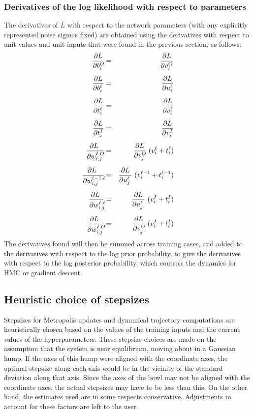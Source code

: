 \documentclass{report}[11pt]
\def\beq{\begin{eqnarray}}
\def\eeq{\end{eqnarray}}
\begin{document}
\subsubsection*{Derivatives of the log likelihood with respect to parameters}

The derivatives of $L$ with respect to the network parameters (with
any explicitly represented noise sigmas fixed) are obtained using the
derivatives with respect to unit values and unit inputs that were found in 
the previous section, as follows:\beq
  {\partial L \over \partial b^O_{i\ }\!} & = & 
    {\partial L \over \partial v^O_i} \\[5pt]
  {\partial L \over \partial b^{\ell}_{i\ }\!} & = & 
    {\partial L \over \partial u^{\ell}_i} \\[5pt]
  {\partial L \over \partial t^{\ell}_{i\ }\!} & = & 
    {\partial L \over \partial v^{\ell}_i} \\[5pt]
  {\partial L \over \partial t^I_{i\ }\!} & = & 
    {\partial L \over \partial v^I_i} \\[5pt]
  {\partial L\ \over \partial w^{\ell,O}_{i,j}\!} & = &
    {\partial L \over \partial v^O_{j\ }\!}\ (v^{\ell}_i+t^{\ell}_i) \\[5pt]
  {\partial L\ \over \partial w^{\ell-1,\ell}_{i,j}\!\!} & = &
    {\partial L \over \partial u^{\ell}_{j\ }\!}\ (v^{\ell-1}_i+t^{\ell-1}_i)
    \\[5pt]
  {\partial L\ \over \partial w^{I,\ell}_{i,j}\!\!} & = &
    {\partial L \over \partial u^{\ell}_{j\ }\!}\ (v^I_i+t^I_i) \\[5pt]
  {\partial L\ \over \partial w^{I,O}_{i,j}\!\!} & = &
    {\partial L \over \partial v^O_{j\ }\!}\ (v^I_i+t^I_i) 
\eeq%
The derivatives found will then be summed across training cases, and 
added to the derivatives with respect to the log prior probability, to
give the derivatives with respect to the log posterior probability,
which controls the dynamics for HMC or gradient descent.


\subsection*{Heuristic choice of stepsizes}\label{app-sec-heuristic}

Stepsizes for Metropolis updates and dynamical trajectory computations
are heuristically chosen based on the values of the training inputs
and the current values of the hyperparameters.  These stepsize choices
are made on the assumption that the system is near equilibrium, moving
about in a Gaussian hump.  If the axes of this hump were aligned with
the coordinate axes, the optimal stepsize along each axis would be in
the vicinity of the standard deviation along that axis.  Since the
axes of the bowl may not be aligned with the coordinate axes, the
actual stepsizes may have to be less than this.  On the other hand,
the estimates used are in some respects conservative.  Adjustments to
account for these factors are left to the user.
\end{document}
